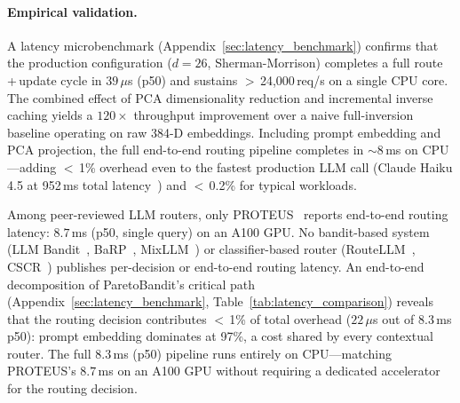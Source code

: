 \paragraph{Empirical validation.}
A latency microbenchmark (Appendix~\ref{sec:latency_benchmark}) confirms that the production configuration ($d{=}26$, Sherman-Morrison) completes a full route\,+\,update cycle in $39\,\mu$s (p50) and sustains $>$\,24{,}000\,req/s on a single CPU core.  The combined effect of PCA dimensionality reduction and incremental inverse caching yields a $120\times$ throughput improvement over a naive full-inversion baseline operating on raw 384-D embeddings.
Including prompt embedding and PCA projection, the full end-to-end routing pipeline completes in ${\sim}8$\,ms on CPU---adding $<$\,1\% overhead even to the fastest production LLM call (Claude Haiku 4.5 at 952\,ms total latency~\cite{ganglani2026llmlatency}) and $<$\,0.2\% for typical workloads.

Among peer-reviewed LLM routers, only PROTEUS~\cite{bhatti2026proteus} reports end-to-end routing latency: $8.7$\,ms (p50, single query) on an A100 GPU.
No bandit-based system (LLM Bandit~\cite{li2025llmbandit}, BaRP~\cite{wang2025barp}, MixLLM~\cite{wang2025mixllm}) or classifier-based router (RouteLLM~\cite{ong2024routellm}, CSCR~\cite{shirkavand2025cscr}) publishes per-decision or end-to-end routing latency.
An end-to-end decomposition of ParetoBandit's critical path (Appendix~\ref{sec:latency_benchmark}, Table~\ref{tab:latency_comparison}) reveals that the routing decision contributes $<$\,1\% of total overhead ($22\,\mu$s out of $8.3$\,ms p50): prompt embedding dominates at 97\%, a cost shared by every contextual router.
The full $8.3$\,ms (p50) pipeline runs entirely on CPU---matching PROTEUS's $8.7$\,ms on an A100 GPU without requiring a dedicated accelerator for the routing decision.